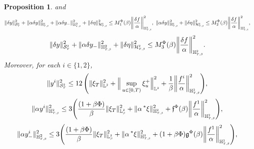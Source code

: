 \documentclass[10pt]{article} %
\newtheorem{proposition}[theorem]{Proposition}
\newcommand\cH{\mathcal H}
\newcommand\cS{\mathcal S}
\newcommand{\smalltext}[1]{\text{\fontsize{4}{4}\selectfont$#1$}}
\newcommand\ff{\mathfrak f}
\newcommand\fg{\mathfrak g}
\def \H{\mathbb{H}}
\def \L{\mathbb{L}}
\newcommand{\brs}[1]{\prescript{\ast}{}{#1}}
\newcommand{\1}{\mathbf{1}}
\begin{document}
\begin{proposition}
	and
	\begin{equation*}
		\|\delta y\|^2_{\cS^\smalltext{2}_\smalltext{T}} + \|\alpha \delta y\|^2_{\H^{\smalltext{2}}_{\smalltext{T}\smalltext{,}\smalltext{\beta}}} + \|\alpha \delta y_-\|^2_{\H^2_{\smalltext{T}\smalltext{,}\smalltext{\beta}}} + \|\delta\eta\|^2_{\cH^{\smalltext{2}}_{\smalltext{T}\smalltext{,}\smalltext{\beta}}} 
		\leq M^\Phi_1(\beta) \bigg\| \frac{\delta f}{\alpha} \bigg\|^2_{\H^{\smalltext{2}}_{\smalltext{T}\smalltext{,}\smalltext{\beta}}},
		\;
		\|\alpha \delta y\|^2_{\H^{\smalltext{2}}_{\smalltext{T}\smalltext{,}\smalltext{\beta}}} + \|\delta\eta\|^2_{\cH^{\smalltext{2}}_{\smalltext{T}\smalltext{,}\smalltext{\beta}}} 
		\leq M^\Phi_2(\beta) \bigg\| \frac{\delta f}{\alpha} \bigg\|^2_{\H^{\smalltext{2}}_{\smalltext{T}\smalltext{,}\smalltext{\beta}}},
	\end{equation*}
	\begin{equation*}
		\|\delta y\|^2_{\cS^\smalltext{2}_\smalltext{T}} + \|\alpha \delta y_-\|^2_{\H^2_{\smalltext{T}\smalltext{,}\smalltext{\beta}}} + \|\delta\eta\|^2_{\cH^{\smalltext{2}}_{\smalltext{T}\smalltext{,}\smalltext{\beta}}} 
		\leq M^\Phi_3(\beta) \bigg\| \frac{\delta f}{\alpha} \bigg\|^2_{\H^{\smalltext{2}}_{\smalltext{T}\smalltext{,}\smalltext{\beta}}}.
	\end{equation*}
	Moreover, for each $i \in \{1,2\}$,
	\begin{equation*}
		\|y^i\|^2_{\cS^\smalltext{2}_\smalltext{T}} \leq 12 \, \Bigg(\|\xi_T\|^2_{\L^\smalltext{2}} + \Big\|\sup_{u \in [0,T)} \xi^+_u\Big\|^2_{\L^\smalltext{2}} +  \frac{1}{\beta}\bigg\|\frac{f^i}{\alpha}\bigg\|^2_{\H^\smalltext{2}_{\smalltext{T}\smalltext{,}\smalltext{\beta}}}\Bigg),
	\end{equation*}
	\begin{equation*}
		\|\alpha y^i\|_{\mathbb{H}^{\smalltext{2}}_{\smalltext{T}\smalltext{,}\smalltext{\beta}}}^2 
		\leq 3 \Bigg( \frac{(1+\beta\Phi)}{\beta} \|\xi_T\|^2_{\L^\smalltext{2}_\smalltext{\beta}} + \|\alpha\brs{\xi}\|^2_{\H^\smalltext{2}_{\smalltext{T}\smalltext{,}\smalltext{\beta}}} +  \ff^\Phi(\beta) \bigg\| \frac{f^1}{\alpha} \bigg\|^2_{\H^{\smalltext{2}}_{\smalltext{T}\smalltext{,}\smalltext{\beta}}} \Bigg),
	\end{equation*}
	\begin{equation*}
		\|\alpha y^i_-\|^2_{\H^2_{\smalltext{T}\smalltext{,}\smalltext{\beta}}} 
		\leq 3 \Bigg( \frac{(1+\beta\Phi)}{\beta} \|\xi_T\|^2_{\L^\smalltext{2}_\smalltext{\beta}} + \|\alpha\brs{\xi}\|^2_{\H^\smalltext{2}_{\smalltext{T}\smalltext{,}\smalltext{\beta}}} +  (1+\beta\Phi) \fg^\Phi(\beta) \bigg\| \frac{f^1}{\alpha} \bigg\|^2_{\H^{\smalltext{2}}_{\smalltext{T}\smalltext{,}\smalltext{\beta}}} \Bigg),

\end{equation*}
\end{proposition}
\end{document}
